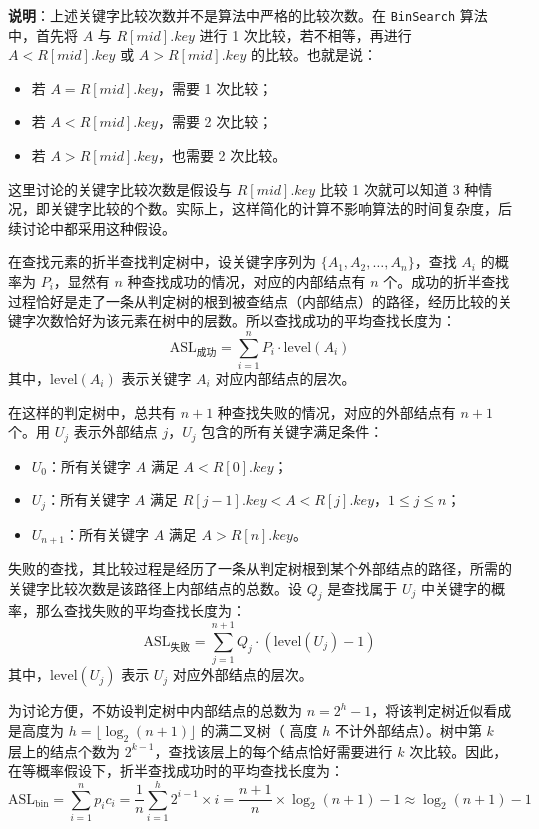 \documentclass[lang=cn,newtx,10pt,scheme=chinese]{elegantbook}
\begin{document}
\textbf{说明}：上述关键字比较次数并不是算法中严格的比较次数。在 \texttt{BinSearch} 算法中，首先将 $A$ 与 $R[mid].key$ 进行 1 次比较，若不相等，再进行 $A < R[mid].key$ 或 $A > R[mid].key$ 的比较。也就是说：
\begin{itemize}
  \item 若 $A = R[mid].key$，需要 1 次比较；
  \item 若 $A < R[mid].key$，需要 2 次比较；
  \item 若 $A > R[mid].key$，也需要 2 次比较。
\end{itemize}
这里讨论的关键字比较次数是假设与 $R[mid].key$ 比较 1 次就可以知道 3 种情况，即关键字比较的个数。实际上，这样简化的计算不影响算法的时间复杂度，后续讨论中都采用这种假设。



在查找元素的折半查找判定树中，设关键字序列为 $\{A_1, A_2, \dots, A_n\}$，查找 $A_i$ 的概率为 $P_i$，显然有 $n$ 种查找成功的情况，对应的内部结点有 $n$ 个。成功的折半查找过程恰好是走了一条从判定树的根到被查结点（内部结点）的路径，经历比较的关键字次数恰好为该元素在树中的层数。所以查找成功的平均查找长度为：
\[
\text{ASL}_{\text{成功}} = \sum_{i=1}^n P_i \cdot \text{level}(A_i)
\]
其中，$\text{level}(A_i)$ 表示关键字 $A_i$ 对应内部结点的层次。

在这样的判定树中，总共有 $n+1$ 种查找失败的情况，对应的外部结点有 $n+1$ 个。用 $U_j$ 表示外部结点 $j$，$U_j$ 包含的所有关键字满足条件：
\begin{itemize}
  \item $U_0$：所有关键字 $A$ 满足 $A < R[0].key$；
  \item $U_j$：所有关键字 $A$ 满足 $R[j-1].key < A < R[j].key$，$1 \leq j \leq n$；
  \item $U_{n+1}$：所有关键字 $A$ 满足 $A > R[n].key$。
\end{itemize}

失败的查找，其比较过程是经历了一条从判定树根到某个外部结点的路径，所需的关键字比较次数是该路径上内部结点的总数。设 $Q_j$ 是查找属于 $U_j$ 中关键字的概率，那么查找失败的平均查找长度为：
\[
\text{ASL}_{\text{失败}} = \sum_{j=1}^{n+1} Q_j \cdot (\text{level}(U_j) - 1)
\]
其中，$\text{level}(U_j)$ 表示 $U_j$ 对应外部结点的层次。


为讨论方便，不妨设判定树中内部结点的总数为 $n = 2^h - 1$，将该判定树近似看成是高度为 $h = \lfloor \log_2 (n+1) \rfloor$ 的满二叉树（
高度 $h$ 不计外部结点）。树中第 $k$ 层上的结点个数为 $2^{k-1}$，查找该层上的每个结点恰好需要进行 $k$ 次比较。因此，在等概率假设下，折半查找成功时的平均查找长度为：
\[
\text{ASL}_{\text{bin}} = \sum_{i=1}^{n} p_i c_i = \frac{1}{n} \sum_{i=1}^{h} 2^{i-1} \times i = \frac{n+1}{n} \times \log_2 (n+1) -1 \approx \log_2 (n+1) -1
\]
\end{document}
